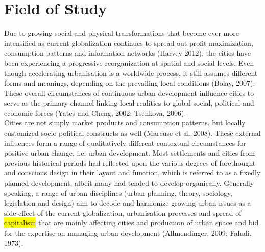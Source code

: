 \documentclass[11pt]{report}
\begin{document}
\section{Field of Study}
Due to growing social and physical transformations that become ever more intensified as current globalization continues to spread out profit maximization, consumption patterns and information networks (Harvey 2012), the cities have been experiencing a progressive reorganization at spatial and social levels. Even though accelerating urbanisation is a worldwide process, it still assumes different forms and meanings, depending on the prevailing local conditions (Bolay, 2007). These overall circumstances of continuous urban development influence cities to serve as the primary channel linking local realities to global social, political and economic forces (Yates and Cheng, 2002; Tsenkova, 2006).
\\
Cities are not simply market products and consumption patterns, but locally customized socio-political constructs as well (Marcuse et al. 2008). These external influences form a range of qualitatively different contextual circumstances for positive urban change, i.e. urban development. Most settlements and cities from previous historical periods had reflected upon the various degrees of forethought and conscious design in their layout and function, which is referred to as a fixedly planned development, albeit many had tended to develop organically. Generally speaking, a range of urban disciplines (urban planning, theory, sociology, legislation and design) aim to decode and harmonize growing urban issues as a side-effect of the current globalization, urbanisation processes and spread of \hl{capitalism} that are mainly affecting cities and production of urban space and bid for the expertise on managing urban development (Allmendinger, 2009; Faludi, 1973). 
\\
\end{document}
